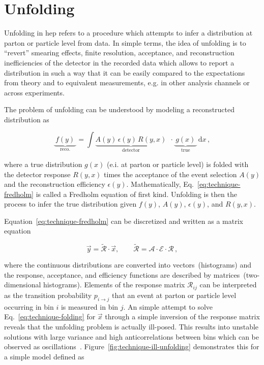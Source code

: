 \section{Unfolding}

Unfolding in \gls{hep} refers to a procedure which attempts to infer a distribution at parton or particle level from data. In simple terms, the idea of unfolding is to ``revert'' smearing effects, finite resolution, acceptance, and reconstruction inefficiencies of the detector in the recorded data which allows to report a distribution in such a way that it can be easily compared to the expectations from theory and to equivalent measurements, e.g. in other analysis channels or across experiments.

The problem of unfolding can be understood by modeling a reconstructed distribution as 

\begin{equation}
\underbrace{~f(y)~}_\mathrm{reco.}=\int \underbrace{A(y)\,\epsilon(y)\, R(y,x)}_\mathrm{detector}~~\cdot \underbrace{~g(x)~}_\mathrm{true}\, \mathrm{d}x\,, \label{eq:technique-fredholm}
\end{equation}

where a true distribution $g(x)$ (e.i. at parton or particle level) is folded with the detector response $R(y,x)$ times the acceptance of the event selection $A(y)$ and the reconstruction efficiency $\epsilon(y)$. Mathematically, Eq.~\ref{eq:technique-fredholm} is called a Fredholm equation of first kind. Unfolding is then the process to infer the true distribution given $f(y)$, $A(y)$, $\epsilon(y)$, and $R(y,x)$. 

Equation~\ref{eq:technique-fredholm} can be discretized and written as a matrix equation

\begin{equation}
\vec{y} = \widetilde{\mathcal{R}}\cdot\vec{x},\qquad \widetilde{\mathcal{R}}=\mathcal{A}\cdot\mathcal{E}\cdot\mathcal{R}\,, \label{eq:technique-folding}
\end{equation}

where the continuous distributions are converted into vectors~(histograms) and the response, acceptance, and efficiency functions are described by matrices~(two-dimensional histograms). Elements of the response matrix $\mathcal{R}_{ij}$ can be interpreted as the transition probability $p_{i\to j}$ that an event at parton or particle level occurring in bin $i$ is measured in bin $j$. An simple attempt to solve Eq.~\ref{eq:technique-folding} for $\vec{x}$ through a simple inversion of the response matrix reveals that the unfolding problem is actually ill-posed. This results into unstable solutions with large variance and high anticorrelations between bins which can be observed as oscillations~\cite{Cowan:2002in}. Figure~\ref{fig:technique-ill-unfolding} demonstrates this for a simple model defined as

